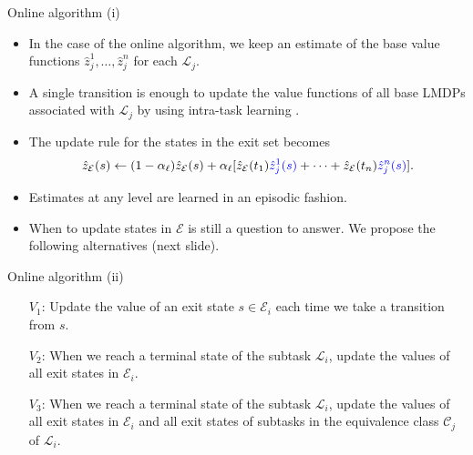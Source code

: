 \documentclass{beamer}
\theoremstyle{mystyle}
\newcommand{\cC}{\mathcal{C}}
\newcommand{\cE}{\mathcal{E}}
\newcommand{\cL}{\mathcal{L}}
\begin{document}
\begin{frame}{Online algorithm (i)}

\begin{itemize}
    
    \item In the case of the online algorithm, we keep an estimate of the base value functions $\hat{z}_j^1,\ldots,\hat{z}_j^n$ for each $\cL_j$.
    \item A single transition is enough to update the value functions of all base LMDPs associated with  $\cL_j$ by using intra-task learning \cite{Kaelbling93}.
    \item The update rule for the states in the exit set becomes
    \[
        \hat{z}_\cE(s) \leftarrow (1 - \alpha_\ell) \hat{z}_\cE(s) + \alpha_\ell [\hat{z}_\cE(t_1) {\color{blue}\hat{z}_j^1(s)} + \cdots + \hat{z}_\cE(t_n) {\color{blue} \hat{z}_j^n(s)}].
    \]
    \item Estimates at any level are learned in an episodic fashion.
    \item When to update states in $\cE$ is still a question to answer. We propose the following alternatives (next slide).
\end{itemize}
    
\end{frame}


\begin{frame}{Online algorithm (ii)}

\begin{itemize}
\item[$V_1$:] Update the value of an exit state $s\in\cE_i$ each time we take a transition from $s$.
\item[$V_2$:] When we reach a terminal state of the subtask $\cL_i$, update the values of all exit states in $\cE_i$.
\item[$V_3$:] When we reach a terminal state of the subtask $\cL_i$, update the values of all exit states in $\cE_i$ and all exit states of subtasks in the equivalence class $\cC_j$ of $\cL_i$.
\end{itemize}


    
\end{frame}
\end{document}

